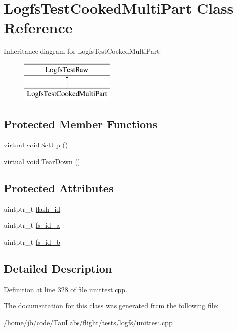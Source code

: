 \hypertarget{class_logfs_test_cooked_multi_part}{\section{\-Logfs\-Test\-Cooked\-Multi\-Part \-Class \-Reference}
\label{class_logfs_test_cooked_multi_part}
}
\-Inheritance diagram for \-Logfs\-Test\-Cooked\-Multi\-Part\-:\begin{figure}[H]
\begin{center}
\leavevmode
\includegraphics[height=2.000000cm]{class_logfs_test_cooked_multi_part}
\end{center}
\end{figure}
\subsection*{\-Protected \-Member \-Functions}
\begin{DoxyCompactItemize}
\item 
virtual void \hyperlink{group___unit_tests_ga6143b6807b4ed29675a12d317dda0b87}{\-Set\-Up} ()
\item 
virtual void \hyperlink{group___unit_tests_ga5031a2adb8db0e1125f0f2f2e5d0c82b}{\-Tear\-Down} ()
\end{DoxyCompactItemize}
\subsection*{\-Protected \-Attributes}
\begin{DoxyCompactItemize}
\item 
uintptr\-\_\-t \hyperlink{group___unit_tests_ga503c4ee9ad8abab85d6fb34d0397944c}{flash\-\_\-id}
\item 
uintptr\-\_\-t \hyperlink{group___unit_tests_gadeab2644468b89d495d396f0e55524e6}{fs\-\_\-id\-\_\-a}
\item 
uintptr\-\_\-t \hyperlink{group___unit_tests_ga2398cf58e337f70603e12a997936f0c9}{fs\-\_\-id\-\_\-b}
\end{DoxyCompactItemize}


\subsection{\-Detailed \-Description}


\-Definition at line 328 of file unittest.\-cpp.



\-The documentation for this class was generated from the following file\-:\begin{DoxyCompactItemize}
\item 
/home/jb/code/\-Tau\-Labs/flight/tests/logfs/\hyperlink{logfs_2unittest_8cpp}{unittest.\-cpp}\end{DoxyCompactItemize}
